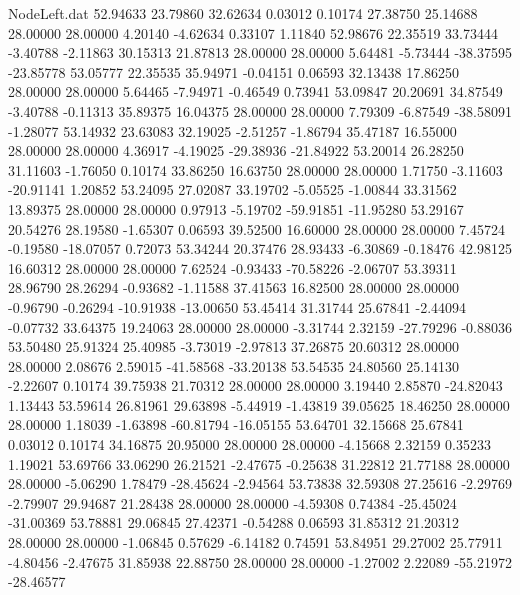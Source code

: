 \begin{filecontents}{NodeLeft.dat}
  52.94633   23.79860   32.62634     0.03012    0.10174   27.38750   25.14688   28.00000   28.00000    4.20140   -4.62634    0.33107    1.11840
  52.98676   22.35519   33.73444    -3.40788   -2.11863   30.15313   21.87813   28.00000   28.00000    5.64481   -5.73444  -38.37595  -23.85778
  53.05777   22.35535   35.94971    -0.04151    0.06593   32.13438   17.86250   28.00000   28.00000    5.64465   -7.94971   -0.46549    0.73941
  53.09847   20.20691   34.87549    -3.40788   -0.11313   35.89375   16.04375   28.00000   28.00000    7.79309   -6.87549  -38.58091   -1.28077
  53.14932   23.63083   32.19025    -2.51257   -1.86794   35.47187   16.55000   28.00000   28.00000    4.36917   -4.19025  -29.38936  -21.84922
  53.20014   26.28250   31.11603    -1.76050    0.10174   33.86250   16.63750   28.00000   28.00000    1.71750   -3.11603  -20.91141    1.20852
  53.24095   27.02087   33.19702    -5.05525   -1.00844   33.31562   13.89375   28.00000   28.00000    0.97913   -5.19702  -59.91851  -11.95280
  53.29167   20.54276   28.19580    -1.65307    0.06593   39.52500   16.60000   28.00000   28.00000    7.45724   -0.19580  -18.07057    0.72073
  53.34244   20.37476   28.93433    -6.30869   -0.18476   42.98125   16.60312   28.00000   28.00000    7.62524   -0.93433  -70.58226   -2.06707
  53.39311   28.96790   28.26294    -0.93682   -1.11588   37.41563   16.82500   28.00000   28.00000   -0.96790   -0.26294  -10.91938  -13.00650
  53.45414   31.31744   25.67841    -2.44094   -0.07732   33.64375   19.24063   28.00000   28.00000   -3.31744    2.32159  -27.79296   -0.88036
  53.50480   25.91324   25.40985    -3.73019   -2.97813   37.26875   20.60312   28.00000   28.00000    2.08676    2.59015  -41.58568  -33.20138
  53.54535   24.80560   25.14130    -2.22607    0.10174   39.75938   21.70312   28.00000   28.00000    3.19440    2.85870  -24.82043    1.13443
  53.59614   26.81961   29.63898    -5.44919   -1.43819   39.05625   18.46250   28.00000   28.00000    1.18039   -1.63898  -60.81794  -16.05155
  53.64701   32.15668   25.67841     0.03012    0.10174   34.16875   20.95000   28.00000   28.00000   -4.15668    2.32159    0.35233    1.19021
  53.69766   33.06290   26.21521    -2.47675   -0.25638   31.22812   21.77188   28.00000   28.00000   -5.06290    1.78479  -28.45624   -2.94564
  53.73838   32.59308   27.25616    -2.29769   -2.79907   29.94687   21.28438   28.00000   28.00000   -4.59308    0.74384  -25.45024  -31.00369
  53.78881   29.06845   27.42371    -0.54288    0.06593   31.85312   21.20312   28.00000   28.00000   -1.06845    0.57629   -6.14182    0.74591
  53.84951   29.27002   25.77911    -4.80456   -2.47675   31.85938   22.88750   28.00000   28.00000   -1.27002    2.22089  -55.21972  -28.46577

\end{filecontents}
